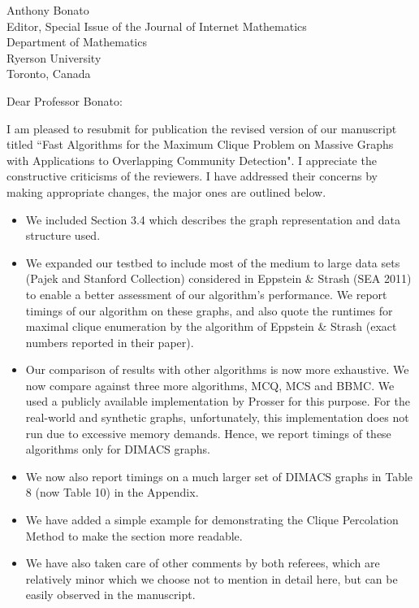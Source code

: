 \begin{letter}{
Anthony Bonato \\
Editor, Special Issue of the Journal of Internet Mathematics  \\
Department of Mathematics \\
Ryerson University \\
Toronto, Canada
}

\opening{Dear Professor Bonato:}

I am pleased to resubmit for publication the revised version of our manuscript titled ``Fast Algorithms for the Maximum Clique Problem on Massive Graphs with Applications to Overlapping Community Detection". I appreciate the constructive criticisms of the reviewers. I have addressed their concerns by making appropriate changes, the major ones are outlined below.

\begin{itemize}
\item We included Section 3.4 which describes the graph representation and data structure used.
\item We expanded our testbed to include most of the medium to large data sets (Pajek and Stanford Collection) considered in Eppstein \& Strash (SEA 2011) to enable a better assessment of our algorithm's performance. We report timings of our algorithm on these graphs, and also quote the runtimes for maximal clique enumeration by the algorithm of Eppstein \& Strash (exact numbers reported in their paper).
\item Our comparison of results with other algorithms is now more exhaustive. We now compare against three more algorithms, MCQ, MCS and BBMC. We used a publicly available implementation by Prosser for this purpose. For the real-world and synthetic graphs, unfortunately, this implementation does not run due to excessive memory demands. Hence, we report timings of these algorithms only for DIMACS graphs. 
\item We now also report timings on a much larger set of DIMACS graphs in Table 8 (now Table 10) in the Appendix.
\item We have added a simple example for demonstrating the Clique Percolation Method to make the section more readable.
\item We have also taken care of other comments by both referees, which are relatively minor which we choose not to mention in detail here, but can be easily observed in the manuscript.
\end{itemize}


\end{letter}

